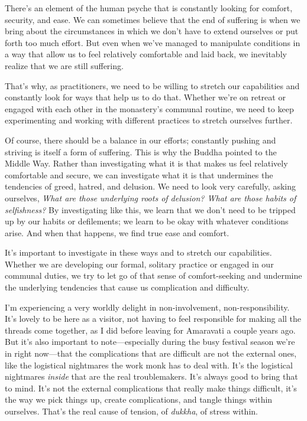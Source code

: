 
There's an element of the human psyche that is constantly looking for 
comfort, security, and ease. We can sometimes believe that the end of 
suffering is when we bring about the circumstances in which we don't 
have to extend ourselves or put forth too much effort. But even when 
we've managed to manipulate conditions in a way that allow us to feel 
relatively comfortable and laid back, we inevitably realize that we are 
still suffering.

That's why, as practitioners, we need to be willing to stretch our 
capabilities and constantly look for ways that help us to do that. 
Whether we're on retreat or engaged with each other in the monastery's 
communal routine, we need to keep experimenting and working with 
different practices to stretch ourselves further.

Of course, there should be a balance in our efforts; constantly pushing 
and striving is itself a form of suffering. This is why the Buddha 
pointed to the Middle Way. Rather than investigating what it is that 
makes us feel relatively comfortable and secure, we can investigate 
what it is that undermines the tendencies of greed, hatred, and 
delusion. We need to look very carefully, asking ourselves, \emph{What 
are those underlying roots of delusion? What are those habits of 
selfishness?} By investigating like this, we learn that we don't need 
to be tripped up by our habits or defilements; we learn to be okay with 
whatever conditions arise. And when that happens, we find true ease and 
comfort.

It's important to investigate in these ways and to stretch our 
capabilities. Whether we are developing our formal, solitary practice 
or engaged in our communal duties, we try to let go of that sense of 
comfort-seeking and undermine the underlying tendencies that cause us 
complication and difficulty.


I'm experiencing a very worldly delight in non-involvement, 
non-responsibility. It's lovely to be here as a visitor, not having to 
feel responsible for making all the threads come together, as I did 
before leaving for Amaravati a couple years ago. But it's also 
important to note---especially during the busy festival season we're in 
right now---that the complications that are difficult are not the 
external ones, like the logistical nightmares the work monk has to deal 
with. It's the logistical nightmares \emph{inside} that are the real 
troublemakers. It's always good to bring that to mind. It's not the 
external complications that really make things difficult, it's the way 
we pick things up, create complications, and tangle things within 
ourselves. That's the real cause of tension, of \emph{dukkha}, of 
stress within.

